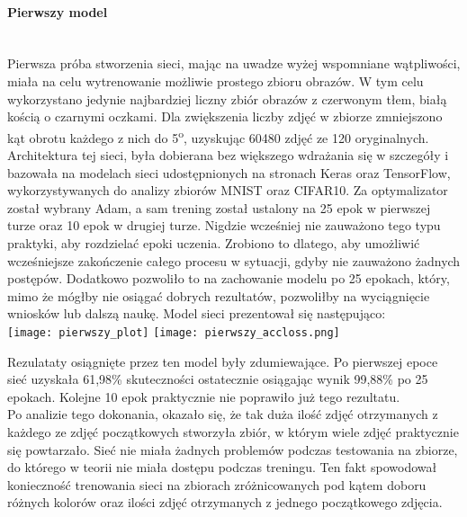 \paragraph{Pierwszy model} \mbox{}\\
Pierwsza próba stworzenia sieci, mając na uwadze wyżej wspomniane wątpliwości, miała
na celu wytrenowanie możliwie prostego zbioru obrazów. W tym celu wykorzystano jedynie
najbardziej liczny zbiór obrazów z czerwonym tłem, białą kością o czarnymi oczkami. Dla zwiększenia liczby zdjęć w zbiorze zmniejszono kąt obrotu każdego z nich do
5\textsuperscript{o}, uzyskując 60480 zdjęć ze 120 oryginalnych.\\
Architektura tej sieci, była dobierana bez większego wdrażania się w szczegóły i
bazowała na modelach sieci udostępnionych na stronach Keras oraz TensorFlow,
wykorzystywanych do analizy zbiorów MNIST oraz CIFAR10. Za optymalizator został wybrany
Adam, a sam trening został ustalony na 25 epok w pierwszej turze oraz 10 epok w drugiej
turze. Nigdzie wcześniej nie zauważono tego typu praktyki, aby rozdzielać epoki uczenia.
Zrobiono to dlatego, aby umożliwić wcześniejsze zakończenie całego procesu w sytuacji, gdyby nie zauważono żadnych postępów. Dodatkowo pozwoliło to na zachowanie modelu
po 25 epokach, który, mimo że mógłby nie osiągać dobrych rezultatów, pozwoliłby
na wyciągnięcie wniosków lub dalszą naukę. Model sieci prezentował się następująco:\\
\texttt{[image: pierwszy\_plot]}
\texttt{[image: pierwszy\_accloss.png]}

Rezulataty osiągnięte przez ten model były zdumiewające. Po pierwszej epoce
sieć uzyskała 61,98\% skuteczności ostatecznie osiągając wynik 99,88\% po 25 epokach.
Kolejne 10 epok praktycznie nie poprawiło już tego rezultatu.\\
Po analizie tego dokonania, okazało się, że tak duża ilość zdjęć otrzymanych
z każdego ze zdjęć początkowych stworzyła zbiór, w którym wiele zdjęć praktycznie się
powtarzało. Sieć nie miała żadnych problemów podczas testowania na zbiorze, do którego w teorii nie miała dostępu podczas treningu. Ten fakt spowodował konieczność
trenowania sieci na zbiorach zróżnicowanych pod kątem doboru różnych kolorów oraz
ilości zdjęć otrzymanych z jednego początkowego zdjęcia.

